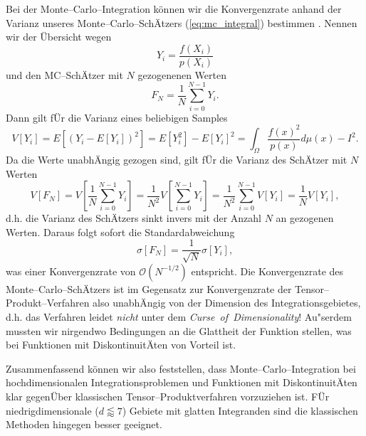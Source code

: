	Bei der Monte--Carlo--Integration können wir die Konvergenzrate anhand der Varianz unseres Monte--Carlo--SchÄtzers (\ref{eq:mc_integral}) bestimmen \citep[][2.4.1]{Veach:1997p9136}. Nennen wir der Übersicht wegen
	$$Y_i=\frac{f(X_i)}{p(X_i)}$$
	und den MC--SchÄtzer mit $N$ gezogenenen Werten
	$$F_N=\frac{1}{N}\sum_{i=0}^{N-1} Y_i.$$
	Dann gilt fÜr die Varianz eines beliebigen Samples
	\begin{equation}
		V[Y_i]=E[(Y_i-E[Y_i])^2]=E[Y_i^2]-E[Y_i]^2=\int_\Omega \frac{f(x)^2}{p(x)}d\mu(x)-I^2.
		\label{eq:mc_variance}
	\end{equation}
	Da die Werte unabhÄngig gezogen sind, gilt fÜr die Varianz des SchÄtzer mit $N$ Werten
	$$V[F_N]=V\left[\frac{1}{N}\sum_{i=0}^{N-1}Y_i\right]=\frac{1}{N^2}V\left[\sum_{i=0}^{N-1}Y_i\right]=\frac{1}{N^2}\sum_{i=0}^{N-1}V[Y_i]=\frac{1}{N}V[Y_i],$$
	d.h. die Varianz des SchÄtzers sinkt invers mit der Anzahl $N$ an gezogenen Werten. Daraus folgt sofort die Standardabweichung
	\begin{equation}
		\sigma[F_N]=\frac{1}{\sqrt{N}}\sigma[Y_i],
		\label{eq:mc_standarddeviation}
	\end{equation}
	was einer Konvergenzrate von $\mathcal{O}(N^{-1/2})$ entspricht. Die Konvergenzrate des Monte--Carlo--SchÄtzers ist im Gegensatz zur Konvergenzrate der Tensor--Produkt--Verfahren also unabhÄngig von der Dimension des Integrationsgebietes, d.h. das Verfahren leidet {\em nicht} unter dem {\em Curse~of~Dimensionality}! Au"serdem mussten wir nirgendwo Bedingungen an die Glattheit der Funktion stellen, was bei Funktionen mit DiskontinuitÄten von Vorteil ist.
	
	Zusammenfassend können wir also feststellen, dass Monte--Carlo--Integration bei hochdimensionalen Integrationsproblemen und Funktionen mit DiskontinuitÄten klar gegenÜber klassischen Tensor--Produktverfahren vorzuziehen ist. FÜr niedrigdimensionale ($d\lessapprox 7$) Gebiete mit glatten Integranden sind die klassischen Methoden hingegen besser geeignet.
	
	
